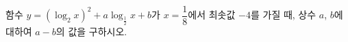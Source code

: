 함수 $y=(\log_2 x)^2+a\log_{\frac{1}{2}} x+b$가 $x=\dfrac{1}{8}$에서 최솟값 $-4$를 가질 때, 상수 $a$, $b$에 대하여 $a-b$의 값을 구하시오.
